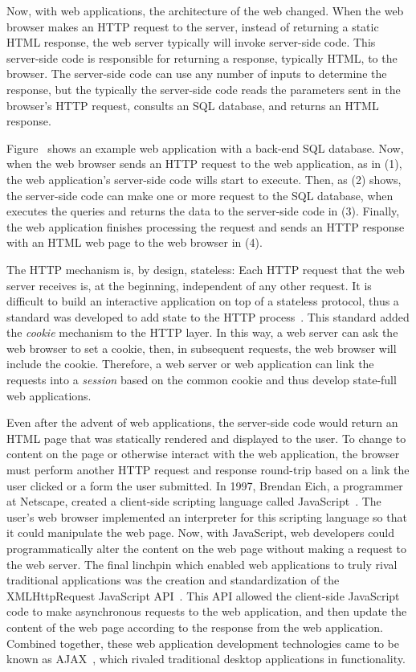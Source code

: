 Now, with web applications, the architecture of the web changed. When
the web browser makes an HTTP request to the server, instead of
returning a static HTML response, the web server typically will invoke
server-side code. This server-side code is responsible for returning a
response, typically HTML, to the browser. The server-side code can use
any number of inputs to determine the response, but the typically the
server-side code reads the parameters sent in the browser's HTTP
request, consults an SQL database, and returns an HTML response.



Figure~ shows an example web
application with a back-end SQL database. Now, when the web browser
sends an HTTP request to the web application, as in (1), the web
application's server-side code wills start to execute. Then, as (2)
shows, the server-side code can make one or more request to the SQL
database, when executes the queries and returns the data to the
server-side code in (3). Finally, the web application finishes
processing the request and sends an HTTP response with an HTML web
page to the web browser in (4).

The HTTP mechanism is, by design, stateless: Each HTTP request that
the web server receives is, at the beginning, independent of any other
request. It is difficult to build an interactive application on top of
a stateless protocol, thus a standard was developed to add state to
the HTTP process~\cite{kristol97:cookies}. This standard added the
\emph{cookie} mechanism to the HTTP layer. In this way, a web server
can ask the web browser to set a cookie, then, in subsequent requests,
the web browser will include the cookie. Therefore, a web server or
web application can link the requests into a \emph{session} based on
the common cookie and thus develop state-full web applications.

Even after the advent of web applications, the server-side code would
return an HTML page that was statically rendered and displayed to the
user. To change to content on the page or otherwise interact with the
web application, the browser must perform another HTTP request and
response round-trip based on a link the user clicked or a form the
user submitted. In 1997, Brendan Eich, a programmer at Netscape,
created a client-side scripting language called
JavaScript~\cite{ecmascript97}. The user's web browser implemented an
interpreter for this scripting language so that it could manipulate
the web page. Now, with JavaScript, web developers could
programmatically alter the content on the web page without making a
request to the web server. The final linchpin which enabled web
applications to truly rival traditional applications was the creation
and standardization of the XMLHttpRequest JavaScript
API~\cite{vankesteren06:xmlhttprequest}. This API allowed the
client-side JavaScript code to make asynchronous requests to the web
application, and then update the content of the web page according to
the response from the web application. Combined together, these web
application development technologies came to be known as
AJAX~\cite{garrett05:ajax}, which rivaled traditional desktop
applications in functionality. 

